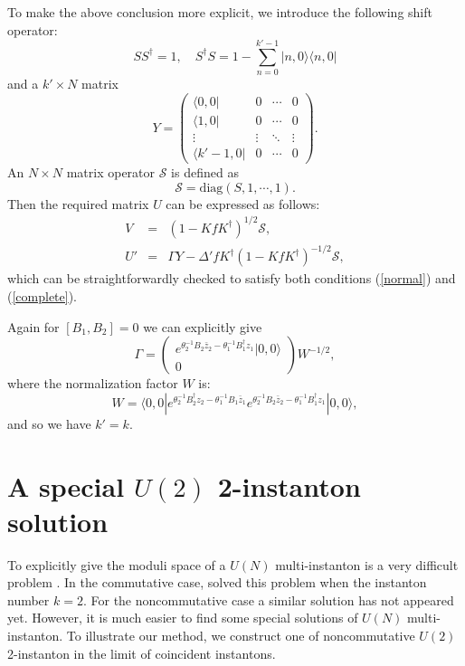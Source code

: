 \documentclass[a4paper,a4paper]{article}
\begin{document}
To make the above conclusion more explicit, we introduce the
following shift operator:
\begin{equation}\label{U begin}
SS^\dag=1,\quad S^\dag S=1-\sum_{n=0}^{k'-1}|n,0\rangle\langle
n,0|
\end{equation}
and a $k'\times N$ matrix
\begin{equation}
Y=\left(\begin{array}{cccc} \langle 0,0| & 0 & \cdots & 0 \\
\langle 1,0| & 0 & \cdots & 0 \\ \vdots & \vdots & \ddots & \vdots
\\ \langle k'-1,0| & 0 & \cdots & 0 \end{array}\right).
\end{equation}
An $N\times N$ matrix operator $\mathcal{S}$ is defined as
\begin{equation}
\mathcal{S}=\mathrm{diag}(S,1,\cdots,1).
\end{equation}
Then the required matrix $U$ can be expressed as follows:
\begin{eqnarray}
V&=&(1-K f K^\dag)^{1/2}\mathcal{S},\\
U'&=&\Gamma
Y-\Delta'fK^\dag(1-KfK^\dag)^{-1/2}\mathcal{S},\label{U end}
\end{eqnarray}
which can be straightforwardly checked to satisfy both conditions
(\ref{normal}) and (\ref{complete}).

Again for $[B_1,B_2]=0$ we can explicitly give
\begin{equation}\label{Gamma}
\Gamma=\left(\begin{array}{c}
e^{\theta_2^{-1}B_2\bar{z}_2-\theta_1^{-1}B_1^\dag z_1}|0,0\rangle
\\ 0
\end{array}\right)W^{-1/2},
\end{equation}
where the normalization factor $W$ is:
\begin{equation}
W=\langle 0,0|e^{\theta_2^{-1}B_2^\dag
z_2-\theta_1^{-1}B_1\bar{z}_1}e^{\theta_2^{-1}B_2
\bar{z}_2-\theta_1^{-1}B_1^\dag z_1}|0,0\rangle,
\end{equation}
and so we have $k'=k$.

\section{A special $U(2)$ 2-instanton solution}

To explicitly give the moduli space of a $U(N)$ multi-instanton is
a very difficult problem \cite{multi}. In the commutative case,
\cite{2-instanton} solved this problem when the instanton number
$k=2$. For the noncommutative case a similar solution has not
appeared yet. However, it is much easier to find some special
solutions of $U(N)$ multi-instanton. To illustrate our method, we
construct one of noncommutative $U(2)$ 2-instanton in the limit of
coincident instantons.
\end{document}
